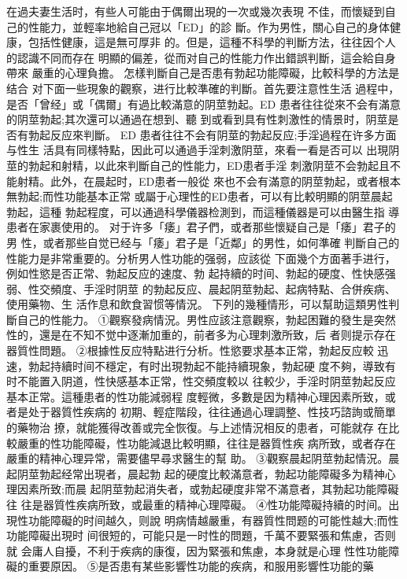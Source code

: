 \documentclass[12pt,UTF8]{ctexbook}
\begin{document}
在過夫妻生活时，有些人可能由于偶爾出現的一次或幾次表現
不佳，而懷疑到自己的性能力，並輕率地給自己冠以「ED」的診
斷。作为男性，關心自己的身体健康，包括性健康，這是無可厚非
的。但是，這種不科學的判斷方法，往往因个人的認識不同而存在
明顯的偏差，從而对自己的性能力作出錯誤判斷，這会給自身帶來
嚴重的心理負擔。
怎樣判斷自己是否患有勃起功能障礙，比較科學的方法是结合
对下面一些現象的觀察，进行比較準確的判斷。首先要注意性生活
過程中，是否「曾经」或「偶爾」有過比較滿意的阴莖勃起。ED
患者往往從來不会有滿意的阴莖勃起;其次還可以通過在想到、聽
到或看到具有性刺激性的情景时，阴莖是否有勃起反应來判斷。
ED 患者往往不会有阴莖的勃起反应;手淫過程在许多方面与性生
活具有同樣特點，因此可以通過手淫刺激阴莖，來看一看是否可以
出現阴莖的勃起和射精，以此來判斷自己的性能力，ED患者手淫
刺激阴莖不会勃起且不能射精。此外，在晨起时，ED患者一般從
來也不会有滿意的阴莖勃起，或者根本無勃起;而性功能基本正常
或屬于心理性的ED患者，可以有比較明顯的阴莖晨起勃起，這種
勃起程度，可以通過科學儀器检測到，而這種儀器是可以由醫生指
導患者在家裹使用的。
对于许多「痿」君子們，或者那些懷疑自己是「痿」君子的男
性，或者那些自觉已经与「痿」君子是「近鄰」的男性，如何準確
判斷自己的性能力是非常重要的。分析男人性功能的强弱，应該從
下面幾个方面著手进行，例如性慾是否正常、勃起反应的速度、勃
起持續的时间、勃起的硬度、性快感强弱、性交頻度、手淫时阴莖
的勃起反应、晨起阴莖勃起、起病特點、合併疾病、使用藥物、生
活作息和飲食習惯等情況。
下列的幾種情形，可以幫助這類男性判斷自己的性能力。
①觀察發病情況。男性应該注意觀察，勃起困難的發生是突然
性的，還是在不知不觉中逐漸加重的，前者多为心理刺激所致，后
者则提示存在器質性問題。
②根據性反应特點进行分析。性慾要求基本正常，勃起反应較
迅速，勃起持續时间不穩定，有时出現勃起不能持續現象，勃起硬
度不夠，導致有时不能置入阴道，性快感基本正常，性交頻度較以
往較少，手淫时阴莖勃起反应基本正常。這種患者的性功能減弱程
度輕微，多數是因为精神心理因素所致，或者是处于器質性疾病的
初期、輕症階段，往往通過心理調整、性技巧諮詢或簡單的藥物治
撩，就能獲得改善或完全恢復。与上述情況相反的患者，可能就存
在比較嚴重的性功能障礙，性功能減退比較明顯，往往是器質性疾
病所致，或者存在嚴重的精神心理异常，需要儘早尋求醫生的幫
助。
③觀察晨起阴莖勃起情況。晨起阴莖勃起经常出現者，晨起勃
起的硬度比較滿意者，勃起功能障礙多为精神心理因素所致;而晨
起阴莖勃起消失者，或勃起硬度非常不滿意者，其勃起功能障礙往
往是器質性疾病所致，或最重的精神心理障礙。
④性功能障礙持續的时间。出現性功能障礙的时间越久，则說
明病情越嚴重，有器質性問题的可能性越大;而性功能障礙出現时
间很短的，可能只是一时性的問題，千萬不要緊張和焦慮，否则就
会庸人自擾，不利于疾病的康復，因为緊張和焦慮，本身就是心理
性性功能障礙的重要原因。
⑤是否患有某些影響性功能的疾病，和服用影響性功能的藥
\end{document}
